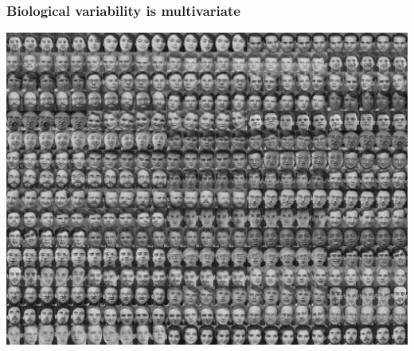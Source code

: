 \begin{frame}
\frametitle{Biological variability is multivariate}
\begin{center}
\includegraphics[height=0.6\textwidth]{faces_orig}
\end{center}
\end{frame}





